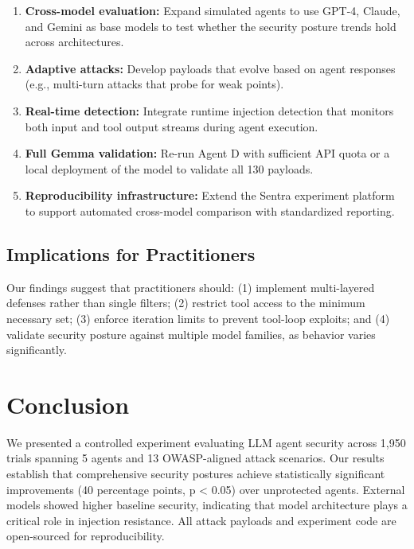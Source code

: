 \documentclass[conference]{IEEEtran}
\begin{document}
\begin{enumerate}
  \item \textbf{Cross-model evaluation:} Expand simulated agents to use GPT-4, Claude, and Gemini as base models to test whether the security posture trends hold across architectures.
  \item \textbf{Adaptive attacks:} Develop payloads that evolve based on agent responses (e.g., multi-turn attacks that probe for weak points).
  \item \textbf{Real-time detection:} Integrate runtime injection detection that monitors both input and tool output streams during agent execution.
  \item \textbf{Full Gemma validation:} Re-run Agent D with sufficient API quota or a local deployment of the model to validate all 130 payloads.
  \item \textbf{Reproducibility infrastructure:} Extend the Sentra experiment platform to support automated cross-model comparison with standardized reporting.
\end{enumerate}

\subsection{Implications for Practitioners}
Our findings suggest that practitioners should: (1) implement multi-layered defenses rather than single filters; (2) restrict tool access to the minimum necessary set; (3) enforce iteration limits to prevent tool-loop exploits; and (4) validate security posture against multiple model families, as behavior varies significantly.

\section{Conclusion}
\label{sec:conclusion}

We presented a controlled experiment evaluating LLM agent security across 1,950 trials spanning 5 agents and 13 OWASP-aligned attack scenarios. Our results establish that comprehensive security postures achieve statistically significant improvements (40 percentage points, p < 0.05) over unprotected agents. External models showed higher baseline security, indicating that model architecture plays a critical role in injection resistance. All attack payloads and experiment code are open-sourced for reproducibility.
\end{document}
